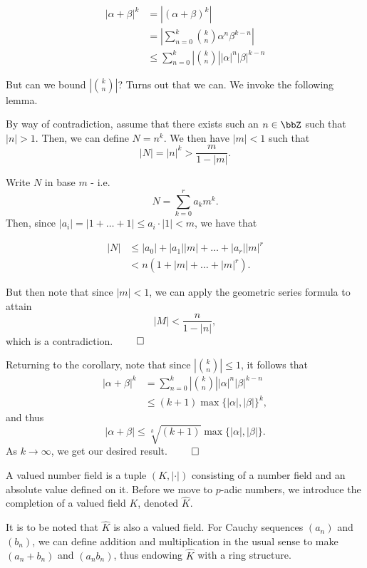 \documentclass[a4paper, 12pt,oneside,openany]{book}
\begin{document}
\begin{align*}
	|\alpha+\beta|^k &= |(\alpha+\beta)^k| \\
	&= \left|\sum\limits_{n=0}^k \binom{k}{n} \alpha^n \beta^{k-n}\right| \\ 
	&\leq \sum\limits_{n=0}^k \left|\binom{k}{n}\right| |\alpha|^n |\beta|^{k-n}
\end{align*}

But can we bound $|\binom{k}{n}|$? Turns out that we can. We invoke the following lemma.


 By way of contradiction, assume that there exists such an $n\in\bbZ$ such that $|n|>1$. Then, we can define $N=n^k$. We then have $|m|<1$ such that $$|N|=|n|^k > \frac{m}{1-|m|}.$$

Write $N$ in base $m$ - i.e. $$N=\sum\limits_{k=0}^r a_k m^k.$$ Then, since $|a_i|= |1+\dots+1| \leq a_i \cdot |1| < m$, we have that 

\begin{align*}
	|N| &\leq |a_0|+|a_1||m|+\dots+|a_r||m|^r \\
	&< n(1+|m|+\dots+|m|^r).
\end{align*}

But then note that since $|m|<1$, we can apply the geometric series formula to attain $$|M|<\frac{n}{1-|n|},$$ which is a contradiction. $\qed$

Returning to the corollary, note that since $|\binom{k}{n}|\leq 1$, it follows that \begin{align*}|\alpha+\beta|^k&=\sum\limits_{n=0}^k \left|\binom{k}{n}\right| |\alpha|^n |\beta|^{k-n}\\ &\leq (k+1) \max\{|\alpha|, |\beta|\}^k,\end{align*} and thus $$|\alpha+\beta| \leq \sqrt[k]{(k+1)} \max\{|\alpha|, |\beta|\}.$$ As $k\to\infty$, we get our desired result. $\qed$

A valued number field is a tuple $(K, |\cdot|)$ consisting of a number field and an absolute value defined on it. Before we move to $p$-adic numbers, we introduce the completion of a valued field $K$, denoted $\hat{K}$. 


It is to be noted that $\hat{K}$ is also a valued field. For Cauchy sequences $(a_n)$ and $(b_n)$, we can define addition and multiplication in the usual sense to make $(a_n+b_n)$ and $(a_nb_n)$, thus endowing $\hat{K}$ with a ring structure.
\end{document}
